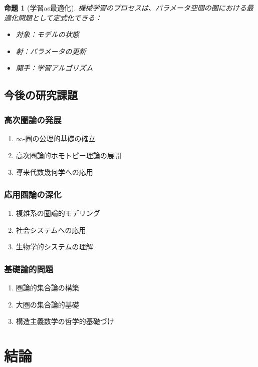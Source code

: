 \documentclass[11pt,a4paper,twocolumn]{ltjsarticle}
\theoremstyle{definition}
\theoremstyle{plain}
\newtheorem{proposition}[definition]{命題}
\begin{document}
\begin{proposition}[学習as最適化]
機械学習のプロセスは、パラメータ空間の圏における最適化問題として定式化できる：
\begin{itemize}
\item 対象：モデルの状態
\item 射：パラメータの更新
\item 関手：学習アルゴリズム
\end{itemize}
\end{proposition}

\subsection{今後の研究課題}

\subsubsection{高次圏論の発展}

\begin{enumerate}
\item $\infty$-圏の公理的基礎の確立
\item 高次圏論的ホモトピー理論の展開
\item 導来代数幾何学への応用
\end{enumerate}

\subsubsection{応用圏論の深化}

\begin{enumerate}
\item 複雑系の圏論的モデリング
\item 社会システムへの応用
\item 生物学的システムの理解
\end{enumerate}

\subsubsection{基礎論的問題}

\begin{enumerate}
\item 圏論的集合論の構築
\item 大圏の集合論的基礎
\item 構造主義数学の哲学的基礎づけ
\end{enumerate}

\section{結論}
\end{document}

